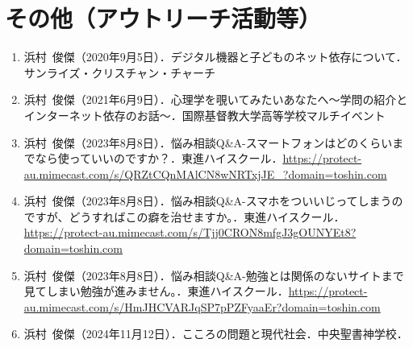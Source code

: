 \documentclass[11pt,a4paper]{article}
\begin{document}
\section{その他（アウトリーチ活動等）}
\begin{enumerate}
	\item 浜村\ 俊傑（2020年9月5日）．デジタル機器と子どものネット依存について．サンライズ・クリスチャン・チャーチ
	\item 浜村\ 俊傑（2021年6月9日）．心理学を覗いてみたいあなたへ〜学問の紹介とインターネット依存のお話〜．国際基督教大学高等学校マルチイベント
	\item 浜村\ 俊傑（2023年8月8日）．悩み相談Q\&A-スマートフォンはどのくらいまでなら使っていいのですか？．東進ハイスクール．\url{https://protect-au.mimecast.com/s/QRZtCQnMAlCN8wNRTxjJE_?domain=toshin.com}
	\item 浜村\ 俊傑（2023年8月8日）．悩み相談Q\&A-スマホをついいじってしまうのですが、どうすればこの癖を治せますか。．東進ハイスクール．\url{https://protect-au.mimecast.com/s/Tjj0CRON8mfgJ3gOUNYEt8?domain=toshin.com}
	\item 浜村\ 俊傑（2023年8月8日）．悩み相談Q\&A-勉強とは関係のないサイトまで見てしまい勉強が進みません。．東進ハイスクール．\url{https://protect-au.mimecast.com/s/HmJHCVARJqSP7pPZFyaaEr?domain=toshin.com}
	\item 浜村\ 俊傑（2024年11月12日）．こころの問題と現代社会．中央聖書神学校．
\end{enumerate}
\end{document}
